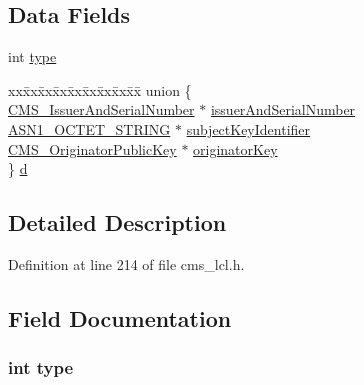 \subsection*{Data Fields}
\begin{DoxyCompactItemize}
\item 
int \hyperlink{struct_c_m_s___originator_identifier_or_key__st_ac765329451135abec74c45e1897abf26}{type}
\item 
\begin{tabbing}
xx\=xx\=xx\=xx\=xx\=xx\=xx\=xx\=xx\=\kill
union \{\\
\>\hyperlink{cms__lcl_8h_a161c64a652f5a8893905640ecf4123b9}{CMS\_IssuerAndSerialNumber} $\ast$ \hyperlink{struct_c_m_s___originator_identifier_or_key__st_a19b1fce417820be55efb728bcb0877bf}{issuerAndSerialNumber}\\
\>\hyperlink{crypto_2ossl__typ_8h_afbd05e94e0f0430a2b729473efec88c1}{ASN1\_OCTET\_STRING} $\ast$ \hyperlink{struct_c_m_s___originator_identifier_or_key__st_ac3ff899746c2156f685737e09ccbb4fa}{subjectKeyIdentifier}\\
\>\hyperlink{cms__lcl_8h_a05196d48afe66b5708a55dc10a1ea640}{CMS\_OriginatorPublicKey} $\ast$ \hyperlink{struct_c_m_s___originator_identifier_or_key__st_a60cade85002694a7ff6582f270f4b4b1}{originatorKey}\\
\} \hyperlink{struct_c_m_s___originator_identifier_or_key__st_ac650b36037587c3dcbd282ad93f3f694}{d}\\

\end{tabbing}\end{DoxyCompactItemize}


\subsection{Detailed Description}


Definition at line 214 of file cms\+\_\+lcl.\+h.



\subsection{Field Documentation}
\subsubsection[{\texorpdfstring{type}{type}}]{\setlength{\rightskip}{0pt plus 5cm}int type}\hypertarget{struct_c_m_s___originator_identifier_or_key__st_ac765329451135abec74c45e1897abf26}{}\label{struct_c_m_s___originator_identifier_or_key__st_ac765329451135abec74c45e1897abf26}


